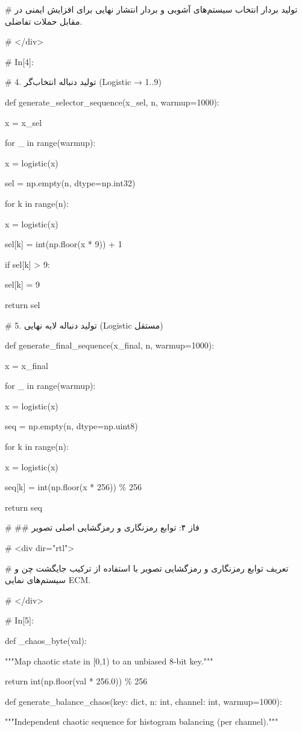 \# تولید بردار انتخاب سیستم‌های آشوبی و بردار انتشار نهایی برای افزایش ایمنی در مقابل حملات تفاضلی.

\# \textless/div\textgreater{}

\# In{[}4{]}:

\# 4. تولید دنباله انتخاب‌گر (Logistic → 1..9)

def generate\_selector\_sequence(x\_sel, n, warmup=1000):

x = x\_sel

for \_ in range(warmup):

x = logistic(x)

sel = np.empty(n, dtype=np.int32)

for k in range(n):

x = logistic(x)

sel{[}k{]} = int(np.floor(x * 9)) + 1

if sel{[}k{]} \textgreater{} 9:

sel{[}k{]} = 9

return sel

\# 5. تولید دنباله لایه نهایی (Logistic مستقل)

def generate\_final\_sequence(x\_final, n, warmup=1000):

x = x\_final

for \_ in range(warmup):

x = logistic(x)

seq = np.empty(n, dtype=np.uint8)

for k in range(n):

x = logistic(x)

seq{[}k{]} = int(np.floor(x * 256)) \% 256

return seq

\# \#\# فاز ۴: توابع رمزنگاری و رمزگشایی اصلی تصویر

\# \textless div dir="rtl"\textgreater{}

\# تعریف توابع رمزنگاری و رمزگشایی تصویر با استفاده از ترکیب جایگشت چن و سیستم‌های نمایی ECM.

\# \textless/div\textgreater{}

\# In{[}5{]}:

def \_chaos\_byte(val):

"""Map chaotic state in {[}0,1) to an unbiased 8-bit key."""

return int(np.floor(val * 256.0)) \% 256

def generate\_balance\_chaos(key: dict, n: int, channel: int, warmup=1000):

"""Independent chaotic sequence for histogram balancing (per channel)."""

